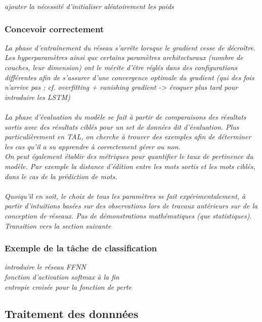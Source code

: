 \documentclass[12pt, french, twoside]{report}
\begin{document}
\textit{ajouter la nécessité d'initialiser aléatoirement les poids}

\subsubsection{Concevoir correctement}

\textit{
    La phase d'entraînement du réseau s'arrête lorsque le gradient cesse de décroître.\\
    Les hyperparamètres ainsi que certains paramètres architecturaux (nombre de couches, leur dimension) ont le mérite d'être réglés dans des configurations différentes afin de s'assurer d'une convergence optimale du gradient (qui des fois n'arrive pas ; cf. overfitting + vanishing gradient -> évoquer plus tard pour introduire les LSTM)\\
    \\
    La phase d'évaluation du modèle se fait à partir de comparaisons des résultats sortis avec des résultats ciblés pour un set de données dit d'évaluation. Plus particulièrement en TAL, on cherche à trouver des exemples afin de déterminer les cas qu'il a su apprendre à correctement gérer ou non.\\
    On peut également établir des métriques pour quantifier le taux de pertinence du modèle.
    Par exemple la distance d'édition entre les mots sortis et les mots ciblés, dans le cas de la prédiction de mots.\\
    \\
    Quoiqu'il en soit, le choix de tous les paramètres se fait expérimentalement, à partir d'intuitions basées sur des observations lors de travaux antérieurs sur de la conception de réseaux. Pas de démonstrations mathématiques (que statistiques).\\
    Transition vers la section suivante}

\subsubsection{Exemple de la tâche de classification}
\textit{introduire le réseau FFNN\\
    fonction d'activation softmax à la fin\\
    entropie croisée pour la fonction de perte\\
    }
\subsection{Traitement des donnnées}
\end{document}
